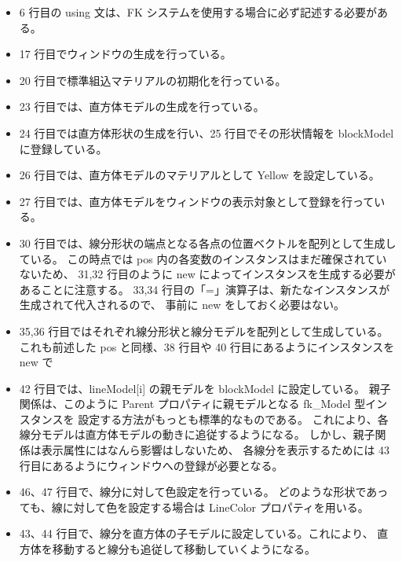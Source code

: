 \begin{itemize}

\item 6 行目の using 文は、FK システムを使用する場合に必ず記述する必要がある。

\item 17 行目でウィンドウの生成を行っている。

\item 20 行目で標準組込マテリアルの初期化を行っている。

\item 23 行目では、直方体モデルの生成を行っている。

\item 24 行目では直方体形状の生成を行い、25 行目でその形状情報を blockModel に登録している。

\item 26 行目では、直方体モデルのマテリアルとして Yellow を設定している。

\item 27 行目では、直方体モデルをウィンドウの表示対象として登録を行っている。

\item 30 行目では、線分形状の端点となる各点の位置ベクトルを配列として生成している。
	この時点では pos 内の各変数のインスタンスはまだ確保されていないため、
	31,32 行目のように new によってインスタンスを生成する必要があることに注意する。
	33,34 行目の「=」演算子は、新たなインスタンスが生成されて代入されるので、
	事前に new をしておく必要はない。

\item 35,36 行目ではそれぞれ線分形状と線分モデルを配列として生成している。
	これも前述した pos と同様、38 行目や 40 行目にあるようにインスタンスを new で

\item 42 行目では、lineModel[i] の親モデルを blockModel に設定している。
	親子関係は、このように Parent プロパティに親モデルとなる fk\_Model 型インスタンスを
	設定する方法がもっとも標準的なものである。
	これにより、各線分モデルは直方体モデルの動きに追従するようになる。
	しかし、親子関係は表示属性にはなんら影響はしないため、
	各線分を表示するためには 43 行目にあるようにウィンドウへの登録が必要となる。
	
\item 46、47 行目で、線分に対して色設定を行っている。
	どのような形状であっても、線に対して色を設定する場合は
	LineColor プロパティを用いる。

\item 43、44 行目で、線分を直方体の子モデルに設定している。これにより、
	直方体を移動すると線分も追従して移動していくようになる。


\end{itemize}
